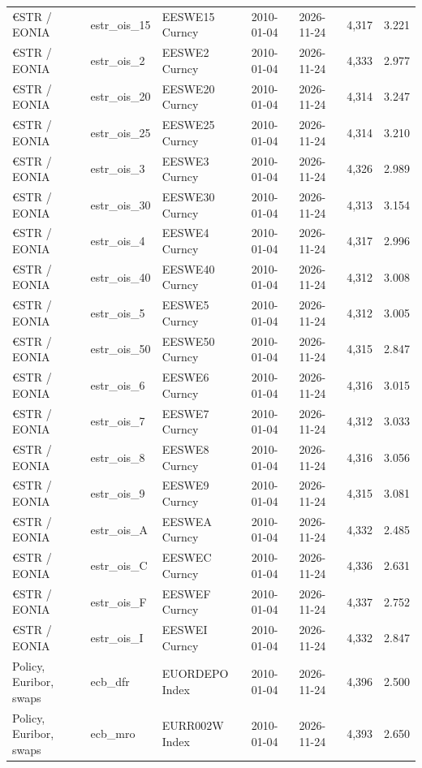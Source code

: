 \documentclass[10pt,a4paper]{article}
\begin{document}
{\begin{longtable}{lllllrr}
€STR / EONIA & estr\_ois\_15 & EESWE15 Curncy & 2010-01-04 & 2026-11-24 & 4,317 & 3.221 \\
€STR / EONIA & estr\_ois\_2 & EESWE2 Curncy & 2010-01-04 & 2026-11-24 & 4,333 & 2.977 \\
€STR / EONIA & estr\_ois\_20 & EESWE20 Curncy & 2010-01-04 & 2026-11-24 & 4,314 & 3.247 \\
€STR / EONIA & estr\_ois\_25 & EESWE25 Curncy & 2010-01-04 & 2026-11-24 & 4,314 & 3.210 \\
€STR / EONIA & estr\_ois\_3 & EESWE3 Curncy & 2010-01-04 & 2026-11-24 & 4,326 & 2.989 \\
€STR / EONIA & estr\_ois\_30 & EESWE30 Curncy & 2010-01-04 & 2026-11-24 & 4,313 & 3.154 \\
€STR / EONIA & estr\_ois\_4 & EESWE4 Curncy & 2010-01-04 & 2026-11-24 & 4,317 & 2.996 \\
€STR / EONIA & estr\_ois\_40 & EESWE40 Curncy & 2010-01-04 & 2026-11-24 & 4,312 & 3.008 \\
€STR / EONIA & estr\_ois\_5 & EESWE5 Curncy & 2010-01-04 & 2026-11-24 & 4,312 & 3.005 \\
€STR / EONIA & estr\_ois\_50 & EESWE50 Curncy & 2010-01-04 & 2026-11-24 & 4,315 & 2.847 \\
€STR / EONIA & estr\_ois\_6 & EESWE6 Curncy & 2010-01-04 & 2026-11-24 & 4,316 & 3.015 \\
€STR / EONIA & estr\_ois\_7 & EESWE7 Curncy & 2010-01-04 & 2026-11-24 & 4,312 & 3.033 \\
€STR / EONIA & estr\_ois\_8 & EESWE8 Curncy & 2010-01-04 & 2026-11-24 & 4,316 & 3.056 \\
€STR / EONIA & estr\_ois\_9 & EESWE9 Curncy & 2010-01-04 & 2026-11-24 & 4,315 & 3.081 \\
€STR / EONIA & estr\_ois\_A & EESWEA Curncy & 2010-01-04 & 2026-11-24 & 4,332 & 2.485 \\
€STR / EONIA & estr\_ois\_C & EESWEC Curncy & 2010-01-04 & 2026-11-24 & 4,336 & 2.631 \\
€STR / EONIA & estr\_ois\_F & EESWEF Curncy & 2010-01-04 & 2026-11-24 & 4,337 & 2.752 \\
€STR / EONIA & estr\_ois\_I & EESWEI Curncy & 2010-01-04 & 2026-11-24 & 4,332 & 2.847 \\
Policy, Euribor, swaps & ecb\_dfr & EUORDEPO Index & 2010-01-04 & 2026-11-24 & 4,396 & 2.500 \\
Policy, Euribor, swaps & ecb\_mro & EURR002W Index & 2010-01-04 & 2026-11-24 & 4,393 & 2.650 \\

\end{longtable}}
\end{document}
